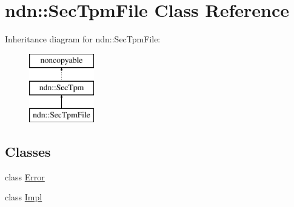 \hypertarget{classndn_1_1SecTpmFile}{}\section{ndn\+:\+:Sec\+Tpm\+File Class Reference}
\label{classndn_1_1SecTpmFile}
Inheritance diagram for ndn\+:\+:Sec\+Tpm\+File\+:\begin{figure}[H]
\begin{center}
\leavevmode
\includegraphics[height=3.000000cm]{classndn_1_1SecTpmFile}
\end{center}
\end{figure}
\subsection*{Classes}
\begin{DoxyCompactItemize}
\item 
class \hyperlink{classndn_1_1SecTpmFile_1_1Error}{Error}
\item 
class \hyperlink{classndn_1_1SecTpmFile_1_1Impl}{Impl}
\end{DoxyCompactItemize}
